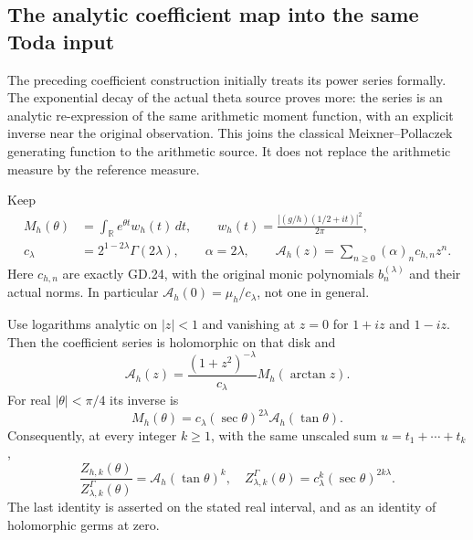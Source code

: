 \subsection[\hspace{0.4em}The analytic coefficient map into the same Toda input]{The analytic coefficient map into the same Toda input}
\label{sec:gamma-toda-analytic-coefficient-map}

The preceding coefficient construction initially treats its power series
formally. The exponential decay of the actual theta source proves more:
the series is an analytic re-expression of the same arithmetic moment
function, with an explicit inverse near the original observation.
This joins the classical Meixner--Pollaczek generating function to the
arithmetic source. It does not replace the arithmetic measure by the
reference measure.

Keep
\[
\begin{split}
M_h(\theta)&=\int_{\mathbb R}e^{\theta t}w_h(t)\,dt,
\qquad w_h(t)=\frac{|(g/h)(1/2+it)|^2}{2\pi},\\
c_\lambda&=2^{1-2\lambda}\Gamma(2\lambda),\qquad
\alpha=2\lambda,\qquad
\mathcal A_h(z)=\sum_{n\geq0}(\alpha)_n c_{h,n}z^n.
\end{split}
\]
Here \(c_{h,n}\) are exactly GD.24, with the original monic polynomials
\(b_n^{(\lambda)}\) and their actual norms. In particular
\(\mathcal A_h(0)=\mu_h/c_\lambda\), not one in general.

\begin{proposition}
Use logarithms analytic on \(|z|<1\) and vanishing at \(z=0\) for
\(1+iz\) and \(1-iz\). Then the coefficient series is holomorphic on
that disk and
\[
\boxed{\mathcal A_h(z)=
 \frac{(1+z^2)^{-\lambda}}{c_\lambda}
 M_h(\arctan z).} \tag{GJ.1}
\]
For real \(|\theta|<\pi/4\) its inverse is
\[
\boxed{M_h(\theta)=c_\lambda(\sec\theta)^{2\lambda}
                 \mathcal A_h(\tan\theta).} \tag{GJ.2}
\]
Consequently, at every integer \(k\geq1\), with the same unscaled sum
\(u=t_1+\cdots+t_k\),
\[
\boxed{\frac{Z_{h,k}(\theta)}{Z^\Gamma_{\lambda,k}(\theta)}
       =\mathcal A_h(\tan\theta)^k,\quad
 Z^\Gamma_{\lambda,k}(\theta)
       =c_\lambda^k(\sec\theta)^{2k\lambda}.} \tag{GJ.3}
\]
The last identity is asserted on the stated real interval, and as an
identity of holomorphic germs at zero.
\end{proposition}

